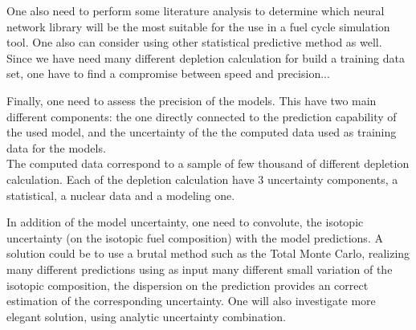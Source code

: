 \documentclass[dvips,12pt]{article}
\begin{document}
One also need to perform some literature analysis to determine which neural network library will be the most suitable for the use in a fuel cycle simulation tool. One also can consider using other statistical predictive method as well.
Since we have need many different depletion calculation for build a training data set, one have to find a compromise between speed and precision...

Finally, one need to assess the precision of the models. This have two main different components: the one directly connected to the prediction capability of the used model, and the uncertainty of the the computed data used as training data for the models.\\
The computed data correspond to a sample of few thousand of different depletion calculation. Each of the depletion calculation have 3 uncertainty components, a statistical, a nuclear data and a modeling one. 

In addition of the model uncertainty, one need to convolute, the isotopic uncertainty (on the isotopic fuel composition) with the model predictions. 
A solution could be to use a brutal method such as the Total Monte Carlo, realizing many different predictions using as input many different  small variation of the isotopic composition, the dispersion on the prediction provides an correct estimation of the corresponding uncertainty. One will also investigate more elegant solution, using analytic uncertainty combination.



\end{document}
